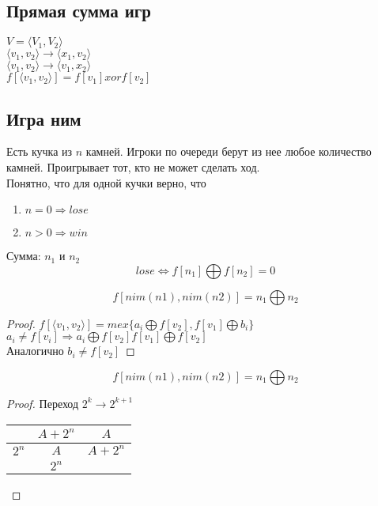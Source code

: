 \subsection{Прямая сумма игр}

$V = \langle V_1, V_2 \rangle$\\

$\langle v_1, v_2 \rangle \rightarrow \langle x_1, v_2 \rangle$\\

$\langle v_1, v_2 \rangle \rightarrow \langle v_1, x_2 \rangle$\\

$f[\langle v_1, v_2 \rangle] = f[v_1] xor f[v_2]$

\subsection{Игра ним}
Есть кучка из $n$ камней. Игроки по очереди берут из нее любое количество камней. Проигрывает тот, кто не может сделать ход.\\

Понятно, что для одной кучки верно, что
\begin{enumerate}
\item $n = 0 \Rightarrow lose$
\item $n > 0 \Rightarrow win$
\end{enumerate}

Сумма: $n_1$ и $n_2$\\
$$lose \Leftrightarrow f[n_1] \bigoplus f[n_2] = 0$$

\begin{theorem}{}
$$f[nim(n1), nim(n2)] = n_1 \bigoplus n_2$$
\end{theorem}

\begin{proof}
$f[\langle v_1, v_2 \rangle] = mex\{a_i \bigoplus f[v_2], f[v_1] \bigoplus b_i\}$\\
$a_i \neq f[v_i] \Rightarrow a_i \bigoplus f[v_2] f[v_1] \bigoplus f[v_2]$\\
Аналогично $b_i \neq f[v_2]$
\end{proof}

\begin{lemma}{}
$$f[nim(n1), nim(n2)] = n_1 \bigoplus n_2$$
\end{lemma}

\begin{proof}
Переход $2^k \rightarrow 2^{k + 1}$\\
\begin{tabular}{c|c|c|}
\hline
      & $A + 2^n$ & $A$\\
\hline
$2^n$ & $A$ & $A + 2^n$\\
\hline
      & $2^n$ &
\end{tabular}
\end{proof}


